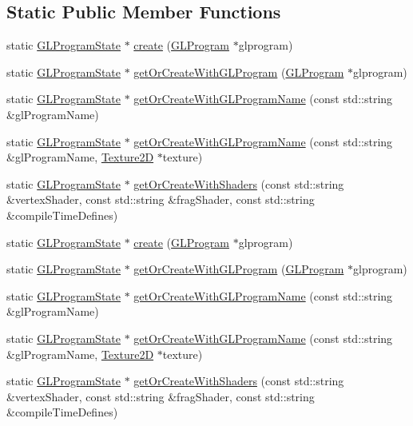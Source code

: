 \subsection*{Static Public Member Functions}
\begin{DoxyCompactItemize}
\item 
static \hyperlink{classGLProgramState}{G\+L\+Program\+State} $\ast$ \hyperlink{classGLProgramState_a8a38bac19b6c031450de5d296a06cff1}{create} (\hyperlink{classGLProgram}{G\+L\+Program} $\ast$glprogram)
\item 
static \hyperlink{classGLProgramState}{G\+L\+Program\+State} $\ast$ \hyperlink{classGLProgramState_a4a43eaaa56be2df54f079994cb18a9f4}{get\+Or\+Create\+With\+G\+L\+Program} (\hyperlink{classGLProgram}{G\+L\+Program} $\ast$glprogram)
\item 
static \hyperlink{classGLProgramState}{G\+L\+Program\+State} $\ast$ \hyperlink{classGLProgramState_adac4b6fae04fff79a0ac28b1c5cac23e}{get\+Or\+Create\+With\+G\+L\+Program\+Name} (const std\+::string \&gl\+Program\+Name)
\item 
static \hyperlink{classGLProgramState}{G\+L\+Program\+State} $\ast$ \hyperlink{classGLProgramState_a4a5473acf86f5f85b1c8ca1afe114078}{get\+Or\+Create\+With\+G\+L\+Program\+Name} (const std\+::string \&gl\+Program\+Name, \hyperlink{classTexture2D}{Texture2D} $\ast$texture)
\item 
static \hyperlink{classGLProgramState}{G\+L\+Program\+State} $\ast$ \hyperlink{classGLProgramState_a2354b8a559b9869ebc4d4973ffd7d68d}{get\+Or\+Create\+With\+Shaders} (const std\+::string \&vertex\+Shader, const std\+::string \&frag\+Shader, const std\+::string \&compile\+Time\+Defines)
\item 
static \hyperlink{classGLProgramState}{G\+L\+Program\+State} $\ast$ \hyperlink{classGLProgramState_a90eaf4f965c2db4272093f64ba5ec9dd}{create} (\hyperlink{classGLProgram}{G\+L\+Program} $\ast$glprogram)
\item 
static \hyperlink{classGLProgramState}{G\+L\+Program\+State} $\ast$ \hyperlink{classGLProgramState_a1b34d78ab3149c2e7fe8f24f414ee715}{get\+Or\+Create\+With\+G\+L\+Program} (\hyperlink{classGLProgram}{G\+L\+Program} $\ast$glprogram)
\item 
static \hyperlink{classGLProgramState}{G\+L\+Program\+State} $\ast$ \hyperlink{classGLProgramState_a6d2b036d98c2f9490d969b059448147d}{get\+Or\+Create\+With\+G\+L\+Program\+Name} (const std\+::string \&gl\+Program\+Name)
\item 
static \hyperlink{classGLProgramState}{G\+L\+Program\+State} $\ast$ \hyperlink{classGLProgramState_a3d2d47637176741d4d4c9a372a8fdf95}{get\+Or\+Create\+With\+G\+L\+Program\+Name} (const std\+::string \&gl\+Program\+Name, \hyperlink{classTexture2D}{Texture2D} $\ast$texture)
\item 
static \hyperlink{classGLProgramState}{G\+L\+Program\+State} $\ast$ \hyperlink{classGLProgramState_a76ea99c645e5a65c97e04bbeeb3b0341}{get\+Or\+Create\+With\+Shaders} (const std\+::string \&vertex\+Shader, const std\+::string \&frag\+Shader, const std\+::string \&compile\+Time\+Defines)
\end{DoxyCompactItemize}
